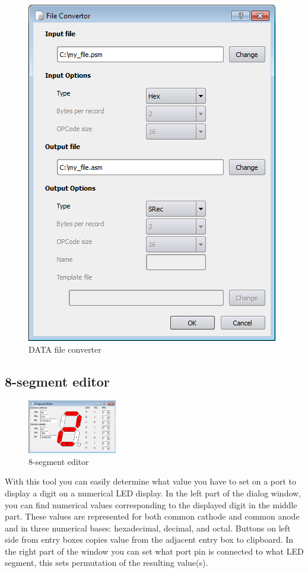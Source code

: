         \enlargethispage{6\baselineskip}
        \begin{figure}[h]
            \centering
            \includegraphics[width=.5\textwidth]{img/DATA_converter.png}
            \caption{DATA file converter}
        \end{figure}

    \clearpage
    \subsection{8-segment editor}
        \begin{figure}
            \centering
            \includegraphics[width=110pt]{img/8segment.png}
            \caption{8-segment editor}
        \end{figure}
        With this tool you can easily determine what value you have to set on a port to display a digit on a numerical LED
        display. In the left part of the dialog window, you can find numerical values corresponding to the displayed digit
        in the middle part. These values are represented for both common cathode and common anode and in three numerical
        bases: hexadecimal, decimal, and octal. Buttons on left side from entry boxes copies value from the adjacent entry
        box to clipboard. In the right part of the window you can set what port pin is connected to what LED segment, this
        sets permutation of the resulting value(s).

